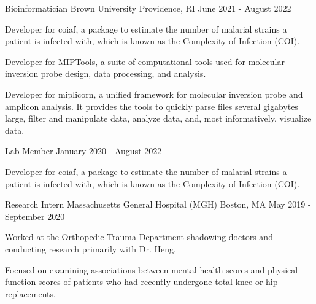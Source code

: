 
\begin{cventries}

  \cventry
    {Bioinformatician} %
    {Brown University} %
    {Providence, RI} %
    {June 2021 - August 2022} %
    {
      \begin{cvitems} %
        \item {Developer for coiaf, a package to estimate the number of malarial
        strains a patient is infected with, which is known as the Complexity of
        Infection (COI).}
        \item {Developer for MIPTools, a suite of computational tools used for
        molecular inversion probe design, data processing, and analysis.}
        \item {Developer for miplicorn, a unified framework for molecular
        inversion probe and amplicon analysis. It provides the tools to quickly
        parse files several gigabytes large, filter and manipulate data,
        analyze data, and, most informatively, visualize data.}
      \end{cvitems}
    }

\cventry
    {Lab Member} %
    {} %
    {} %
    {January 2020 - August 2022} %
    {
      \begin{cvitems} %
        \item {Developer for coiaf, a package to estimate the number of malarial
        strains a patient is infected with, which is known as the Complexity of
        Infection (COI).}
      \end{cvitems}
    }

  \cventry
    {Research Intern} %
    {Massachusetts General Hospital (MGH)} %
    {Boston, MA} %
    {May 2019 - September 2020} %
    {
      \begin{cvitems} %
        \item {Worked at the Orthopedic Trauma Department shadowing doctors and conducting research primarily with Dr. Heng.} 
        \item {Focused on examining associations between mental health scores
        and physical function scores of patients who had recently undergone total knee or hip replacements.}
      \end{cvitems}
    }


\end{cventries}
